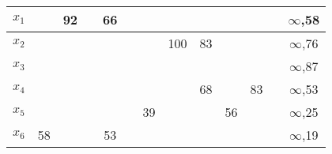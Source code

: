 \documentclass[12pt]{article}
\begin{document}
\begin{enumerate}
\begin{tabular}{|c|c|c|c|c|c|c|c|c|c|c|c|c|}
$x_1$    & {\color[HTML]{000000} }         & {\color[HTML]{000000} 92}       & {\color[HTML]{000000} }         & {\color[HTML]{000000} 66}       & {\color[HTML]{000000} }         & {\color[HTML]{000000} }         & {\color[HTML]{000000} }         & {\color[HTML]{000000} }         & {\color[HTML]{000000} }         & {\color[HTML]{000000} }         & {\color[HTML]{000000} }  & {\color[HTML]{000000} $\infty$,58} \\ \hline
$x_2$    & {\color[HTML]{000000} }         & {\color[HTML]{000000} }         & {\color[HTML]{000000} }         & {\color[HTML]{000000} }         & {\color[HTML]{000000} }         & {\color[HTML]{000000} }         & {\color[HTML]{000000} 100}      & {\color[HTML]{000000} 83}       & {\color[HTML]{000000} }         & {\color[HTML]{000000} }         & {\color[HTML]{000000} }  & {\color[HTML]{000000} $\infty$,76} \\ \hline
$x_3$    & {\color[HTML]{000000} }         & {\color[HTML]{000000} }         & {\color[HTML]{000000} }         & {\color[HTML]{000000} }         & {\color[HTML]{000000} }         & {\color[HTML]{000000} }         & {\color[HTML]{000000} }         & {\color[HTML]{000000} }         & {\color[HTML]{000000} }         & {\color[HTML]{000000} }         & {\color[HTML]{000000} }  & {\color[HTML]{000000} $\infty$,87} \\ \hline
$x_4$    & {\color[HTML]{000000} }         & {\color[HTML]{000000} }         & {\color[HTML]{000000} }         & {\color[HTML]{000000} }         & {\color[HTML]{000000} }         & {\color[HTML]{000000} }         & {\color[HTML]{000000} }         & {\color[HTML]{FE0000} 68}       & {\color[HTML]{000000} }         & {\color[HTML]{FE0000} 83}       & {\color[HTML]{000000} }  & {\color[HTML]{000000} $\infty$,53} \\ \hline
$x_5$    & {\color[HTML]{000000} }         & {\color[HTML]{000000} }         & {\color[HTML]{000000} }         & {\color[HTML]{000000} }         & {\color[HTML]{000000} }         & {\color[HTML]{000000} 39}       & {\color[HTML]{000000} }         & {\color[HTML]{000000} }         & {\color[HTML]{000000} 56}       & {\color[HTML]{000000} }         & {\color[HTML]{000000} }  & {\color[HTML]{000000} $\infty$,25} \\ \hline
$x_6$    & {\color[HTML]{FE0000} 58}       & {\color[HTML]{000000} }         & {\color[HTML]{000000} }         & {\color[HTML]{FE0000} 53}       & {\color[HTML]{000000} }         & {\color[HTML]{000000} }         & {\color[HTML]{000000} }         & {\color[HTML]{000000} }         & {\color[HTML]{000000} }         & {\color[HTML]{000000} }         & {\color[HTML]{000000} }  & {\color[HTML]{000000} $\infty$,19} \\ \hline

\end{tabular}
\end{enumerate}
\end{document}
